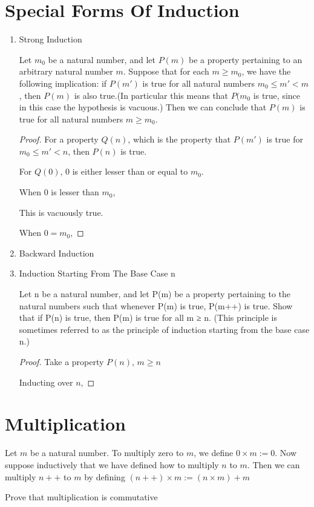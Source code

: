 \documentclass[11pt]{report}
\begin{document}
\section{Special Forms Of Induction}
\label{sec:orgae72335}
\begin{enumerate}
\item Strong Induction
\label{sec:org043a3c3}
\begin{theorem}
Let \(m_0\) be a natural number, and let \(P(m)\) be a property pertaining to an arbitrary natural number \(m\). Suppose that for each \(m \geq m_0\), we have the following implication: if \(P(m')\) is true for all natural numbers \(m_0 \leq m' < m\), then \(P(m)\) is also true.(In particular this means that \(P(m_0\) is true, since in this case the hypothesis is vacuous.) Then we can conclude that \(P(m)\) is true for all natural numbers \(m \geq m_0\).
\end{theorem}
\begin{proof}
For a property \(Q(n)\), which is the property that \(P(m')\) is true for \(m_0 \leq m' < n\), then \(P(n)\) is true.

For \(Q(0)\),
\(0\) is either lesser than or equal to \(m_0\).

When \(0\) is lesser than \(m_0\),

This is vacuously true.

When \(0 = m_0\),
\end{proof}
\item Backward Induction
\label{sec:orgdc305f9}
\item Induction Starting From The Base Case n
\label{sec:orgd71f10a}
\begin{proposition}
Let n be a natural number, and let P(m) be a property pertaining to the natural numbers such that whenever P(m) is true, P(m++) is true. Show that if P(n) is true, then P(m) is true for all m ≥ n. (This principle is sometimes referred to as the principle of induction starting from the base case n.)
\end{proposition}
\begin{proof}
Take a property \(P(n)\), \(m \geq n\)

Inducting over \(n\),
\end{proof}
\end{enumerate}
\section{Multiplication}
\label{sec:org6394a09}
\begin{definition}
Let \(m\) be a natural number. To multiply zero to \(m\), we define \(0 \times m := 0\). Now suppose inductively that we have defined how to multiply \(n\) to \(m\). Then we can multiply \(n++\) to \(m\) by defining \((n++) \times m := (n \times m) + m\)
\end{definition}
\begin{lemma}
Prove that multiplication is commutative
\end{lemma}
\end{document}
